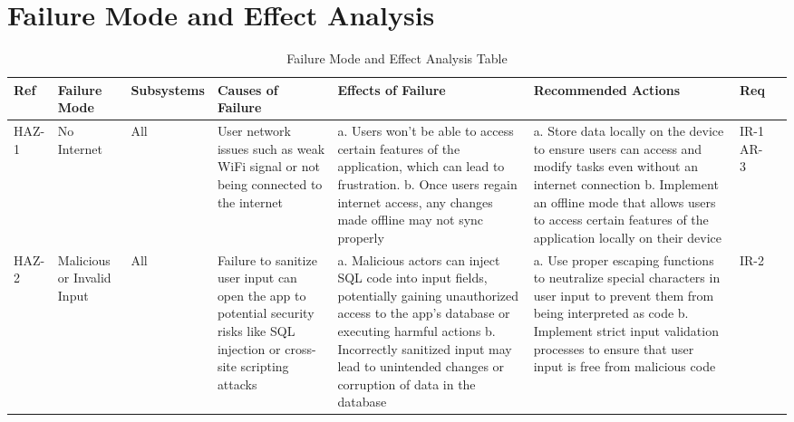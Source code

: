 \documentclass{article}
\begin{document}


\section{Failure Mode and Effect Analysis}
\begin{center}
\setlength\LTleft{-1.5in}
\setlength\LTright{-1.5in}
\begin{longtable}{|p{1.5cm}|p{2cm}|p{2cm}|p{3cm}|p{3.5cm}|p{4cm}|p{1cm}|p{1cm}|}
\caption{Failure Mode and Effect Analysis Table}
\label{tab:table3}\\
\hline
\textbf{Ref} & \textbf{Failure Mode} & \textbf{Subsystems} & \textbf{Causes of Failure} & \textbf{Effects of Failure} & \textbf{Recommended Actions} & \textbf{Req} \\
\hline
HAZ-1 & No Internet & All  & User network issues such as weak WiFi signal or not being connected to the internet & a. Users won't be able to access certain features of the application, which can lead to frustration. \newline b. Once users regain internet access, any changes made offline may not sync properly & a. Store data locally on the device to ensure users can access and modify tasks even without an internet connection \newline b. Implement an offline mode that allows users to access certain features of the application locally on their device & IR-1 \newline AR-3 \\ \hline
HAZ-2 & Malicious or Invalid Input & All & Failure to sanitize user input can open the app to potential security risks like SQL injection or cross-site scripting attacks & a. Malicious actors can inject SQL code into input fields, potentially gaining unauthorized access to the app's database or executing harmful actions \newline b. Incorrectly sanitized input may lead to unintended changes or corruption of data in the database &  a. Use proper escaping functions to neutralize special characters in user input to prevent them from being interpreted as code \newline b. Implement strict input validation processes to ensure that user input is free from malicious code & IR-2 \\ \hline

\end{longtable}
\end{center}
\end{document}
